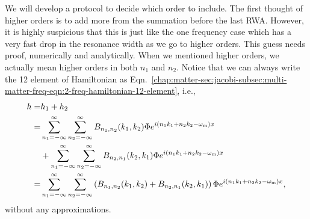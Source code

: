 We will develop a protocol to decide which order to include. The first thought of higher orders is to add more from the summation before the last RWA. However, it is highly suspicious that this is just like the one frequency case which has a very fast drop in the resonance width as we go to higher orders. This guess needs proof, numerically and analytically. When we mentioned higher orders, we actually mean higher orders in both $n_1$ and $n_2$. Notice that we can always write the 12 element of Hamiltonian as Eqn.~\ref{chap:matter-sec:jacobi-subsec:multi-matter-freq-eqn:2-freq-hamiltonian-12-element}, i.e.,
\begin{align}
  h =& h_1 + h_2 \\
   =& \sum_{n_1=-\infty}^\infty \sum_{n_2=-\infty}^{\infty} B_{n_1,n_2}(k_1,k_2) \Phi e^{i(n_1 k_1 + n_2 k_2 - \omega_\mathrm m)x}  \nonumber \\
  &+  \sum_{n_1=-\infty}^\infty \sum_{n_2=-\infty}^{\infty} B_{n_2,n_1}(k_2,k_1) \Phi e^{i(n_1 k_1 + n_2 k_2 - \omega_\mathrm m)x} \nonumber\\
  =& \sum_{n_1=-\infty}^\infty \sum_{n_2=-\infty}^{\infty} \left( B_{n_1,n_2}(k_1,k_2) + B_{n_2,n_1}(k_2,k_1) \right) \Phi e^{i(n_1 k_1 + n_2 k_2 - \omega_\mathrm m)x},
\end{align}
without any approximations.
